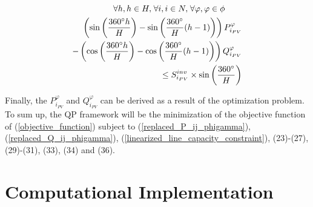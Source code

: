 \documentclass[journal]{IEEEtran}
\begin{document}
\begin{equation}\label{three_phase_PVs_model3}
\begin{split}
\forall h, h \in H, \hskip 1pt \forall i, i \in N, \hskip 1pt \forall \varphi, \varphi \in \phi \hskip 20pt\\ \left(\sin\left(\frac{360^\circ h}{H}\right)- \sin\left(\frac{360^\circ}{H}(h-1)\right)\right)P_{i_{PV}}^{\varphi} \\
-\left(\cos\left(\frac{360^\circ h}{H}\right)- \cos\left(\frac{360^\circ}{H}(h-1)\right)\right)Q_{i_{PV}}^{\varphi} \\ \leq S_{i_{PV}}^{inv} \times \sin\left(\frac{360^\circ}{H}\right)
\end{split}
\end{equation}

Finally, the $P_{i_{PV}}^{\varphi}$ and $Q_{i_{PV}}^{\varphi}$ can be derived as a result of the optimization problem. To sum up, the QP framework will be the minimization of the objective function of (\ref{objective_function}) subject to (\ref{replaced_P_ij_phigamma}), (\ref{replaced_Q_ij_phigamma}), (\ref{linearized_line_capacity_constraint}), (23)-(27), (29)-(31), (33), (34) and (36).




\section{Computational Implementation}
\end{document}
